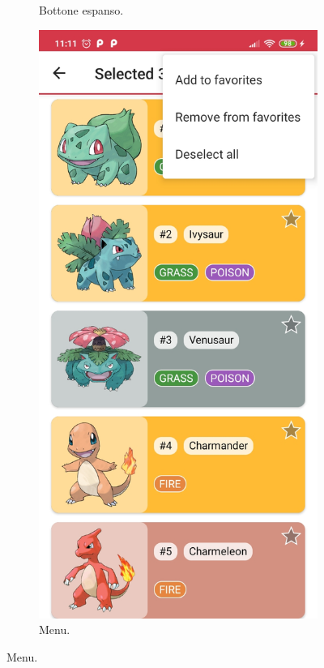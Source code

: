 \documentclass[a4paper,11pt]{article}
\begin{document}
\begin{figure}[h!]
{\begin{subfigure}[b]{0.3\linewidth}
    \caption{Bottone espanso.}
  \end{subfigure}
  \begin{subfigure}[b]{0.3\linewidth}
    \includegraphics[width=\linewidth]{drop_down.jpg}
    \caption{Menu.}
  \end{subfigure}
  \label{fig:home}
  }
\end{figure}
\newpage
\end{document}

